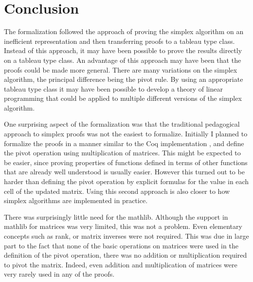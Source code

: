 \documentclass[11pt]{article} %
\begin{document}

\section{Conclusion}


The formalization followed the approach of proving the simplex algorithm on an inefficient representation and then transferring proofs to a tableau type class. Instead of this approach, it may have been possible to prove the results directly on a tableau type class. An advantage of this approach may have been that the proofs could be made more general. There are many variations on the simplex algorithm, the principal difference being the pivot rule. By using an appropriate tableau type class it may have been possible to develop a theory of linear programming that could be applied to multiple different versions of the simplex algorithm.

One surprising aspect of the formalization was that the traditional pedagogical approach to simplex proofs was not the easiest to formalize. Initially I planned to formalize the proofs in a manner similar to the Coq implementation \cite{DBLP:journals/corr/AllamigeonK17}, and define the pivot operation using multiplication of matrices. This might be expected to be easier, since proving properties of functions defined in terms of other functions that are already well understood is usually easier. However this turned out to be harder than defining the pivot operation by explicit formulas for the value in each cell of the updated matrix. Using this second approach is also closer to how simplex algorithms are implemented in practice.

There was surprisingly little need for the mathlib. Although the support in mathlib for matrices was very limited, this was not a problem. Even elementary concepts such as rank, or matrix inverses were not required. This was due in large part to the fact that none of the basic operations on matrices were used in the definition of the pivot operation, there was no addition or multiplication required to pivot the matrix. Indeed, even addition and multiplication of matrices were very rarely used in any of the proofs.



\end{document}
